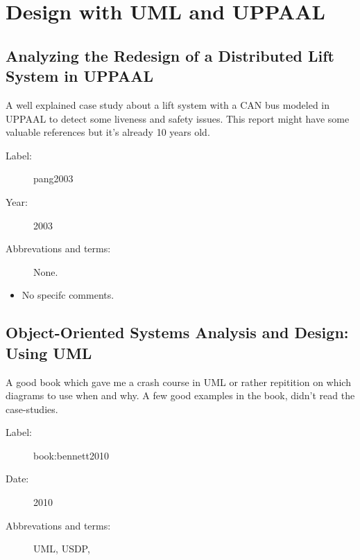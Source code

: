 \chapter{Design with UML and UPPAAL}

\section{Analyzing the Redesign of a Distributed Lift System in UPPAAL}

A well explained case study about a lift system with a CAN bus modeled in
UPPAAL to detect some liveness and safety issues. This report might have some
valuable references but it's already 10 years old.

\begin{description}
    \item[Label:] pang2003 \cite{pang2003}
    \item[Year:] 2003
    \item[Abbrevations and terms:] None.
\end{description}

\begin{itemize}
    \item No specifc comments.
\end{itemize}

\section{Object-Oriented Systems Analysis and Design: Using UML}
A good book which gave me a crash course in UML or rather repitition on which
diagrams to use when and why. A few good examples in the book, didn't read the
case-studies.

\begin{description}
    \item[Label:] book:bennett2010 \cite{book:bennett2010}
    \item[Date:] 2010
    \item[Abbrevations and terms:]
        UML,
        USDP,
\end{description}


